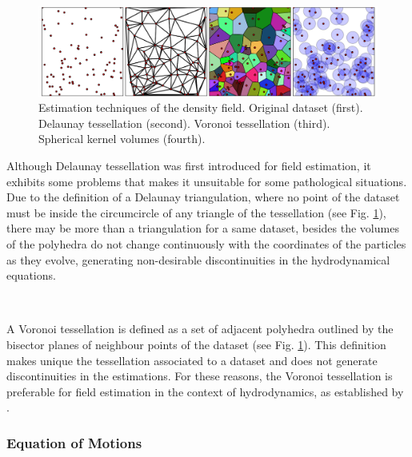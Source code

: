 \documentclass[a4,useAMS,usenatbib,usegraphicx,12pt]{article}
\begin{document}
\
\begin{figure}[h]
\centering

  \includegraphics[trim = 0mm 0mm 0mm 0mm, clip, keepaspectratio=true,
  width=0.7\textheight]{./figures/Tessellations.png}
  
  \caption{\small Estimation techniques of the density field. Original 
  dataset (first). Delaunay tessellation (second). Voronoi tessellation 
  (third). Spherical kernel volumes (fourth). }

  \label{fig:Tessellations}

\end{figure}

Although Delaunay tessellation was first introduced for field estimation, it 
exhibits some problems that makes it unsuitable for some pathological 
situations. Due to the definition of a Delaunay triangulation, where no point 
of the dataset must be inside the circumcircle of any triangle of the 
tessellation (see Fig. \ref{fig:Tessellations}), there may be more than a 
triangulation for a same dataset, besides the volumes of the polyhedra do not 
change continuously with the coordinates of the particles as they evolve, 
generating non-desirable discontinuities in the hydrodynamical equations.

\

A Voronoi tessellation is defined as a set of adjacent polyhedra outlined by
the bisector planes of neighbour points of the dataset (see Fig. 
\ref{fig:Tessellations}). This definition makes unique the tessellation 
associated to a dataset and does not generate discontinuities in the 
estimations. For these reasons, the Voronoi tessellation is preferable for 
field estimation in the context of hydrodynamics, as established by 
\citet{Hess10}.


\subsubsection*{Equation of Motions}
\end{document}
